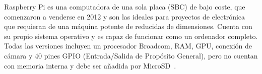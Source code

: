 \begin{figure}[H]
	{\def\svgwidth{.21\textwidth}
		}\label{fig:logoRaspberry}
\end{figure}

Raspberry Pi es una computadora de una sola placa (SBC) de bajo coste, que comenzaron a venderse en 2012 y son las ideales para proyectos de electrónica que requieran de una máquina potente de reducidas de dimensiones. Cuenta con su propio sistema operativo y es capaz de funcionar como un ordenador completo. Todas las versiones incluyen un procesador Broadcom, RAM, GPU, conexión de cámara y 40 pines GPIO (Entrada/Salida de Propósito General), pero no cuentan con memoria interna y debe ser añadida por MicroSD~\cite{noauthor_raspberry_2021}.

